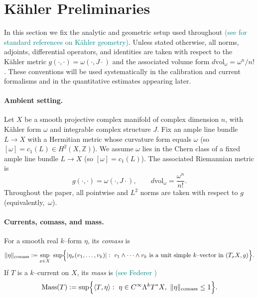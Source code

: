 \documentclass[11pt]{article}
\newcommand{\REVMZ}[1]{\textcolor{teal}{#1}}  %
\numberwithin{equation}{section}  %
\theoremstyle{plain}
\theoremstyle{definition}
\theoremstyle{remark}
\newcommand{\Z}{\mathbb{Z}}
\DeclareMathOperator{\Mass}{Mass}
\begin{document}
\section{K\"ahler Preliminaries}\label{sec:kahler-prelim}

In this section we fix the analytic and geometric setup used throughout \REVMZ{(see \cite{GH78,Wells,Voisin02} for standard references on K\"ahler geometry)}.
Unless stated otherwise, all norms, adjoints, differential operators, and identities are taken with respect to the K\"ahler metric $g(\cdot,\cdot)=\omega(\cdot,J\cdot)$ and the associated volume form $d\mathrm{vol}_\omega=\omega^{n}/n!$.
These conventions will be used systematically in the calibration and current formalisms \REVMZ{\cite{Fed69,HL82}} and in the quantitative estimates appearing later.




\paragraph{Ambient setting.}
Let $X$ be a smooth projective complex manifold of complex dimension $n$, with
K\"ahler form $\omega$ and integrable complex structure $J$. Fix an ample line bundle $L\to X$ with a Hermitian metric whose curvature form equals $\omega$ (so $[\omega]=c_1(L)\in H^2(X,\Z)$).
We assume $\omega$ lies in the Chern class of a fixed ample line bundle $L\to X$ (so $[\omega]=c_1(L)$).
The associated Riemannian metric is
\[
g(\cdot,\cdot)=\omega(\cdot,J\cdot),
\qquad
d\mathrm{vol}_\omega=\frac{\omega^{n}}{n!}.
\]
Throughout the paper, all pointwise and $L^2$ norms are taken with respect to
$g$ (equivalently,~$\omega$).

\paragraph{Currents, comass, and mass.}\label{par:currents-mass}
For a smooth real $k$--form $\eta$, its \emph{comass} is
\[
\|\eta\|_{\mathrm{comass}}
:=\sup_{x\in X}\ \sup\Bigl\{|\eta_x(v_1,\dots,v_k)|:\ v_1\wedge\cdots\wedge v_k\ \text{is a unit simple $k$--vector in }(T_xX,g)\Bigr\}.
\]
If $T$ is a $k$--current on $X$, its \emph{mass} is \REVMZ{(see Federer \cite[4.1.7]{Fed69})}
\[
\Mass(T):=\sup\Bigl\{\langle T,\eta\rangle:\ \eta\in C^\infty\Lambda^{k}T^*X,\ \|\eta\|_{\mathrm{comass}}\le 1\Bigr\}.
\]
\end{document}
